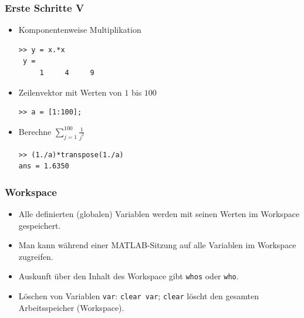 \begin{frame}[fragile]\frametitle{Erste Schritte V}
\begin{itemize}
\item Komponentenweise Multiplikation
\begin{lstlisting}
>> y = x.*x
 y =
     1     4     9
\end{lstlisting}
\item Zeilenvektor mit Werten von $1$ bis $100$
\begin{lstlisting}
>> a = [1:100];
\end{lstlisting}
\item Berechne $\sum_{j=1}^{100} \frac{1}{j^2}$
\begin{lstlisting}
>> (1./a)*transpose(1./a)
ans = 1.6350
\end{lstlisting}
\end{itemize}
\end{frame}
\begin{frame}[fragile]\frametitle{Workspace}
\begin{itemize}
\item Alle definierten (globalen) Variablen  werden mit seinen
Werten im Workspace gespeichert.
\item Man kann während einer MATLAB-Sitzung auf alle 
Variablen im Workspace zugreifen. 
\item Auskunft über den Inhalt des Workspace gibt \lstinline!whos! oder
\lstinline!who!. 
\item Löschen von Variablen \lstinline!var!: \lstinline!clear var!;
\lstinline!clear! löscht den gesamten Arbeitsspeicher (Workspace).
\end{itemize}
\end{frame}

